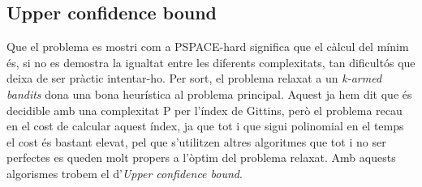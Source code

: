 
	\subsection{Upper confidence bound}
	Que el problema es mostri com a PSPACE-hard significa que el càlcul del mínim és, si no es demostra la igualtat entre
	les diferents complexitats, tan dificultós que deixa de ser pràctic intentar-ho. Per sort, el problema relaxat a un
	\textit{k-armed bandits} dona una bona heurística al problema principal. Aquest ja hem dit que és decidible amb una complexitat P
	 per l'índex de Gittins, però el problema recau en el cost de calcular aquest índex, ja que tot i que sigui polinomial en el temps
	el cost és bastant elevat, pel que s'utilitzen altres algoritmes que tot i no ser perfectes es queden molt propers a l'òptim del 
	problema relaxat. Amb aquests algorismes trobem el d'\textit{Upper confidence bound}. \\
	\\
